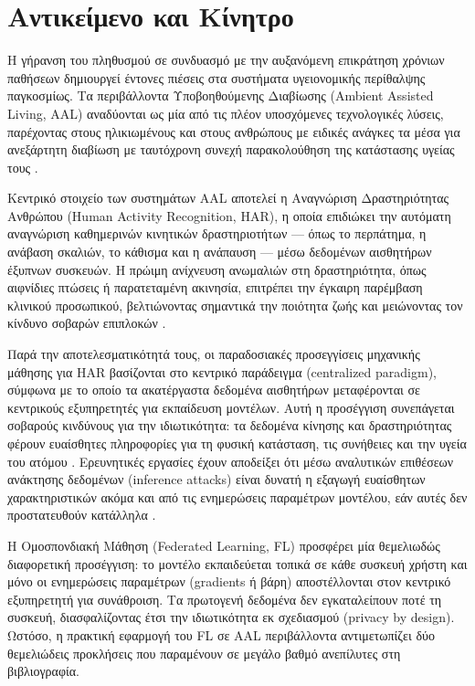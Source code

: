 
\section{Αντικείμενο και Κίνητρο}
\label{sec:motivation}

Η γήρανση του πληθυσμού σε συνδυασμό με την αυξανόμενη επικράτηση χρόνιων
παθήσεων δημιουργεί έντονες πιέσεις στα συστήματα υγειονομικής περίθαλψης
παγκοσμίως. Τα περιβάλλοντα Υποβοηθούμενης Διαβίωσης (Ambient Assisted
Living, AAL) αναδύονται ως μία από τις πλέον υποσχόμενες τεχνολογικές
λύσεις, παρέχοντας στους ηλικιωμένους και στους ανθρώπους με ειδικές
ανάγκες τα μέσα για ανεξάρτητη διαβίωση με ταυτόχρονη συνεχή
παρακολούθηση της κατάστασης υγείας τους \cite{Liu2021}.

Κεντρικό στοιχείο των συστημάτων AAL αποτελεί η Αναγνώριση Δραστηριότητας
Ανθρώπου (Human Activity Recognition, HAR), η οποία επιδιώκει την αυτόματη
αναγνώριση καθημερινών κινητικών δραστηριοτήτων — όπως το περπάτημα, η
ανάβαση σκαλιών, το κάθισμα και η ανάπαυση — μέσω δεδομένων αισθητήρων
έξυπνων συσκευών. Η πρώιμη ανίχνευση ανωμαλιών στη δραστηριότητα, όπως
αιφνίδιες πτώσεις ή παρατεταμένη ακινησία, επιτρέπει την έγκαιρη
παρέμβαση κλινικού προσωπικού, βελτιώνοντας σημαντικά την ποιότητα ζωής
και μειώνοντας τον κίνδυνο σοβαρών επιπλοκών \cite{Liu2021}.

Παρά την αποτελεσματικότητά τους, οι παραδοσιακές προσεγγίσεις μηχανικής
μάθησης για HAR βασίζονται στο κεντρικό παράδειγμα (centralized paradigm),
σύμφωνα με το οποίο τα ακατέργαστα δεδομένα αισθητήρων μεταφέρονται σε
κεντρικούς εξυπηρετητές για εκπαίδευση μοντέλων. Αυτή η προσέγγιση
συνεπάγεται σοβαρούς κινδύνους για την ιδιωτικότητα: τα δεδομένα κίνησης
και δραστηριότητας φέρουν ευαίσθητες πληροφορίες για τη φυσική κατάσταση,
τις συνήθειες και την υγεία του ατόμου \cite{Shokri2015}. Ερευνητικές
εργασίες έχουν αποδείξει ότι μέσω αναλυτικών επιθέσεων ανάκτησης δεδομένων
(inference attacks) είναι δυνατή η εξαγωγή ευαίσθητων χαρακτηριστικών
ακόμα και από τις ενημερώσεις παραμέτρων μοντέλου, εάν αυτές δεν
προστατευθούν κατάλληλα \cite{Shokri2015}.

Η Ομοσπονδιακή Μάθηση (Federated Learning, FL) \cite{McMahan2017} προσφέρει
μία θεμελιωδώς διαφορετική προσέγγιση: το μοντέλο εκπαιδεύεται τοπικά σε
κάθε συσκευή χρήστη και μόνο οι ενημερώσεις παραμέτρων (gradients ή βάρη)
αποστέλλονται στον κεντρικό εξυπηρετητή για συνάθροιση. Τα πρωτογενή
δεδομένα δεν εγκαταλείπουν ποτέ τη συσκευή, διασφαλίζοντας έτσι την
ιδιωτικότητα εκ σχεδιασμού (privacy by design). Ωστόσο, η πρακτική
εφαρμογή του FL σε AAL περιβάλλοντα αντιμετωπίζει δύο θεμελιώδεις
προκλήσεις που παραμένουν σε μεγάλο βαθμό ανεπίλυτες στη βιβλιογραφία.

